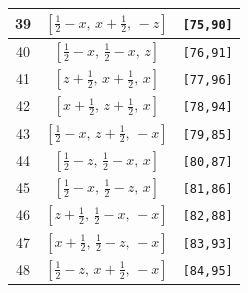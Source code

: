 \documentclass[fleqn,8pt]{jsarticle}
\begin{document}
\begin{longtable}{ccc}
39 & $\left[ \frac{1}{2} - x,\, x + \frac{1}{2},\, - z \right]$ & {\tt [75,90]} \\ \hline
40 & $\left[ \frac{1}{2} - x,\, \frac{1}{2} - x,\, z \right]$ & {\tt [76,91]} \\ \hline
41 & $\left[ z + \frac{1}{2},\, x + \frac{1}{2},\, x \right]$ & {\tt [77,96]} \\ \hline
42 & $\left[ x + \frac{1}{2},\, z + \frac{1}{2},\, x \right]$ & {\tt [78,94]} \\ \hline
43 & $\left[ \frac{1}{2} - x,\, z + \frac{1}{2},\, - x \right]$ & {\tt [79,85]} \\ \hline
44 & $\left[ \frac{1}{2} - z,\, \frac{1}{2} - x,\, x \right]$ & {\tt [80,87]} \\ \hline
45 & $\left[ \frac{1}{2} - x,\, \frac{1}{2} - z,\, x \right]$ & {\tt [81,86]} \\ \hline
46 & $\left[ z + \frac{1}{2},\, \frac{1}{2} - x,\, - x \right]$ & {\tt [82,88]} \\ \hline
47 & $\left[ x + \frac{1}{2},\, \frac{1}{2} - z,\, - x \right]$ & {\tt [83,93]} \\ \hline
48 & $\left[ \frac{1}{2} - z,\, x + \frac{1}{2},\, - x \right]$ & {\tt [84,95]} \\
\end{longtable}
\renewcommand{\arraystretch}{1.2}
\end{document}
